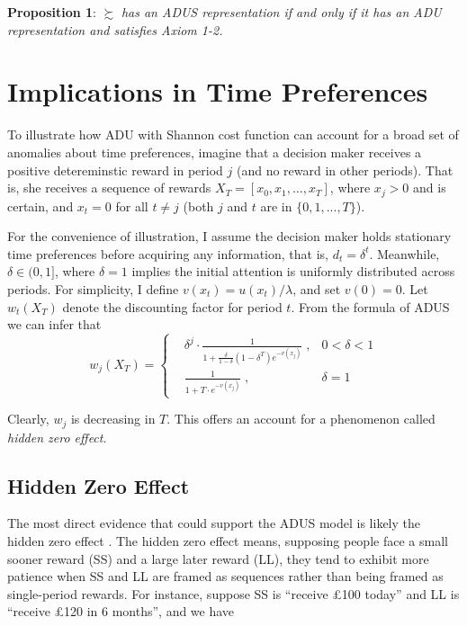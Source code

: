\documentclass[
  12pt,
]{article}
\begin{document}
\textbf{Proposition 1}: \(\succsim\) \emph{has an ADUS representation if
and only if it has an ADU representation and satisfies Axiom 1-2.}

\hypertarget{implications-in-time-preferences}{%
\section{\texorpdfstring{Implications in Time Preferences
\label{behavioral}}{Implications in Time Preferences }}\label{implications-in-time-preferences}}

To illustrate how ADU with Shannon cost function can account for a broad
set of anomalies about time preferences, imagine that a decision maker
receives a positive detereminstic reward in period \(j\) (and no reward
in other periods). That is, she receives a sequence of rewards
\(X_T=[x_0,x_1,…,x_T]\), where \(x_j>0\) and is certain, and \(x_t = 0\)
for all \(t \neq j\) (both \(j\) and \(t\) are in \(\{0,1,...,T\}\)).

For the convenience of illustration, I assume the decision maker holds
stationary time preferences before acquiring any information, that is,
\(d_t=\delta^t\). Meanwhile, \(\delta\in(0,1]\), where \(\delta=1\)
implies the initial attention is uniformly distributed across periods.
For simplicity, I define \(v(x_t)=u(x_t)/\lambda\), and set \(v(0)=0\).
Let \(w_t(X_T)\) denote the discounting factor for period \(t\). From
the formula of ADUS we can infer that\[ 
w_j(X_T) = \left\{ \begin{aligned}
& \delta^j \cdot\frac{1}{1+\frac{\delta}{1-\delta}(1-\delta^T)e^{-v(x_j)}}\;, & 0<\delta<1 \\
& \frac{1}{1+T\cdot e^{-v(x_j)}}\; , & \delta=1
\end{aligned}
\right.
\]

Clearly, \(w_j\) is decreasing in \(T\). This offers an account for a
phenomenon called \emph{hidden zero effect}.

\hypertarget{hidden-zero-effect}{%
\subsection{Hidden Zero Effect}\label{hidden-zero-effect}}

The most direct evidence that could support the ADUS model is likely the
hidden zero effect \citep{magen_hidden-zero_2008}. The hidden zero
effect means, supposing people face a small sooner reward (SS) and a
large later reward (LL), they tend to exhibit more patience when SS and
LL are framed as sequences rather than being framed as single-period
rewards. For instance, suppose SS is ``receive £100 today'' and LL is
``receive £120 in 6 months'', and we have
\end{document}
